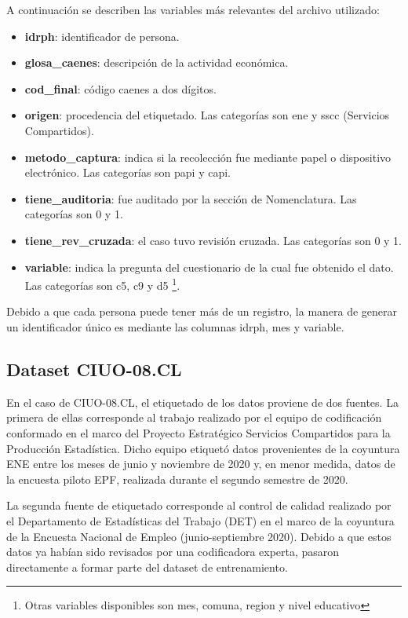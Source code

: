 \documentclass[
  12pt,
  spanish,
]{article}
\providecommand{\tightlist}{%
  \setlength{\itemsep}{0pt}\setlength{\parskip}{0pt}}
\begin{document}
A continuación se describen las variables más relevantes del archivo
utilizado:

\begin{itemize}
\tightlist
\item
  \textbf{idrph}: identificador de persona.
\item
  \textbf{glosa\_caenes}: descripción de la actividad económica.
\item
  \textbf{cod\_final}: código caenes a dos dígitos.
\item
  \textbf{origen}: procedencia del etiquetado. Las categorías son ene y
  sscc (Servicios Compartidos).
\item
  \textbf{metodo\_captura}: indica si la recolección fue mediante papel
  o dispositivo electrónico. Las categorías son papi y capi.
\item
  \textbf{tiene\_auditoria}: fue auditado por la sección de
  Nomenclatura. Las categorías son 0 y 1.
\item
  \textbf{tiene\_rev\_cruzada}: el caso tuvo revisión cruzada. Las
  categorías son 0 y 1.
\item
  \textbf{variable}: indica la pregunta del cuestionario de la cual fue
  obtenido el dato. Las categorías son c5, c9 y d5
  \footnote{Otras variables disponibles son mes, comuna, region y nivel educativo}.
\end{itemize}

Debido a que cada persona puede tener más de un registro, la manera de
generar un identificador único es mediante las columnas idrph, mes y
variable.

\hypertarget{dataset-ciuo-08.cl}{%
\subsection{Dataset CIUO-08.CL}\label{dataset-ciuo-08.cl}}

En el caso de CIUO-08.CL, el etiquetado de los datos proviene de dos
fuentes. La primera de ellas corresponde al trabajo realizado por el
equipo de codificación conformado en el marco del Proyecto Estratégico
Servicios Compartidos para la Producción Estadística. Dicho equipo
etiquetó datos provenientes de la coyuntura ENE entre los meses de junio
y noviembre de 2020 y, en menor medida, datos de la encuesta piloto EPF,
realizada durante el segundo semestre de 2020.

La segunda fuente de etiquetado corresponde al control de calidad
realizado por el Departamento de Estadísticas del Trabajo (DET) en el
marco de la coyuntura de la Encuesta Nacional de Empleo
(junio-septiembre 2020). Debido a que estos datos ya habían sido
revisados por una codificadora experta, pasaron directamente a formar
parte del dataset de entrenamiento.
\end{document}
